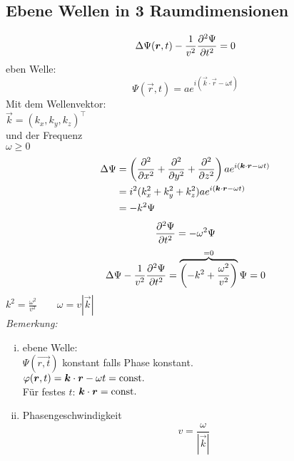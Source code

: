 \subsection{Ebene Wellen in 3 Raumdimensionen}
\begin{equation*}
\Delta \Psi(\bm{r} ,t) - \frac{1}{v^2} \frac{\partial ^2 \Psi}{\partial t^2} = 0
\end{equation*}
eben Welle:
\begin{equation*}
\Psi(\vec{r} ,t) = a e^{i (\vec{k} \cdot \vec{r} - \omega t)}
\end{equation*}
Mit dem Wellenvektor:\\
$ \vec{k} = (k_x, k_y, k_z)^\top $\\
und der Frequenz\\
$ \omega \ge 0 $
\begin{align*}
\Delta \Psi &= \left(\frac{\partial ^2}{\partial x^2} + \frac{\partial ^2}{\partial y^2} + \frac{\partial ^2}{\partial z^2}\right) a e^{i(\bm{k} \cdot \bm{r} - \omega t)} \\
&= i^2 (k_x^2 + k_y^2 + k_z^2) a e^{i(\bm{k} \cdot \bm{r} - \omega t)}\\
&= - k^2 \Psi
\end{align*}
\begin{equation*}
\frac{\partial ^2 \Psi}{\partial t^2} = - \omega^2 \Psi
\end{equation*}
\begin{equation*}
\Delta \Psi - \frac{1}{v^2} \frac{\partial ^2 \Psi}{\partial t^2} = \overbrace{\left(- k^2 + \frac{\omega^2}{v^2}\right)}^{=0} \Psi = 0
\end{equation*}
$ k^2 = \frac{\omega^2}{v^2} \qquad \omega = v |\vec{k}| $\\[5pt]
\emph{Bemerkung:}\\
\begin{minipage}{.5\linewidth}
	\begin{enumerate}[i)]
		\item ebene Welle:\\
		$ \Psi(\vec{r,t}) $ konstant falls Phase konstant.\\
		$ \varphi (\bm{r} ,t) = \bm{k} \cdot \bm{r} - \omega t = \textrm{const.} $\\
		Für festes $ t $: $ \bm{k} \cdot \bm{r} = \textrm{const.} $
		\item Phasengeschwindigkeit
		\begin{equation*}
		v = \frac{\omega}{|\vec{k}|}
		\end{equation*}
	\end{enumerate}
\end{minipage}%
